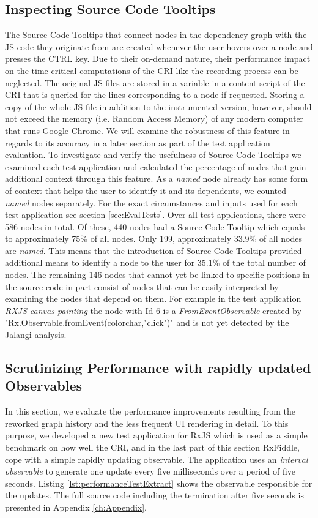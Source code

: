 	\subsection{Inspecting Source Code Tooltips}
	The Source Code Tooltips that connect nodes in the dependency graph with the JS code they originate from are created whenever the user hovers over a node and presses the CTRL key. Due to their on-demand nature, their performance impact on the time-critical computations of the CRI like the recording process can be neglected. The original JS files are stored in a variable in a content script of the CRI that is queried for the lines corresponding to a node if requested. Storing a copy of the whole JS file in addition to the instrumented version, however, should not exceed the memory (i.e. Random Access Memory) of any modern computer that runs Google Chrome. We will examine the robustness of this feature in regards to its accuracy in a later section as part of the test application evaluation. To investigate and verify the usefulness of Source Code Tooltips we examined each test application and calculated the percentage of nodes that gain additional context through this feature. As a \emph{named} node already has some form of context that helps the user to identify it and its dependents, we counted \emph{named} nodes separately. For the exact circumstances and inputs used for each test application see section \ref{sec:EvalTests}. %
	 Over all test applications, there were 586 nodes in total. Of these, 440 nodes had a Source Code Tooltip which equals to approximately 75\% of all nodes. Only 199, approximately 33.9\% of all nodes are \emph{named}. This means that the introduction of Source Code Tooltips provided additional means to identify a node to the user for 35.1\% of the total number of nodes. The remaining 146 nodes that cannot yet be linked to specific positions in the source code in part consist of nodes that can be easily interpreted by examining the nodes that depend on them. For example in the test application \emph{RXJS canvas-painting} the node with Id 6 is a \emph{FromEventObservable} created by "Rx.Observable.fromEvent(colorchar,"click")" and is not yet detected by the Jalangi analysis.

	\subsection{Scrutinizing Performance with rapidly updated Observables}
	\label{sec:PerformanceEvaluation}
	In this section, we evaluate the performance improvements resulting from the reworked graph history and the less frequent UI rendering in detail. To this purpose, we developed a new test application for RxJS which is used as a simple benchmark on how well the CRI, and in the last part of this section RxFiddle, cope with a simple rapidly updating observable. The application uses an \emph{interval observable} to generate one update every five milliseconds over a period of five seconds. Listing \ref{lst:performanceTestExtract} shows the observable responsible for the updates. The full source code including the termination after five seconds is presented in Appendix \ref{ch:Appendix}.
	
